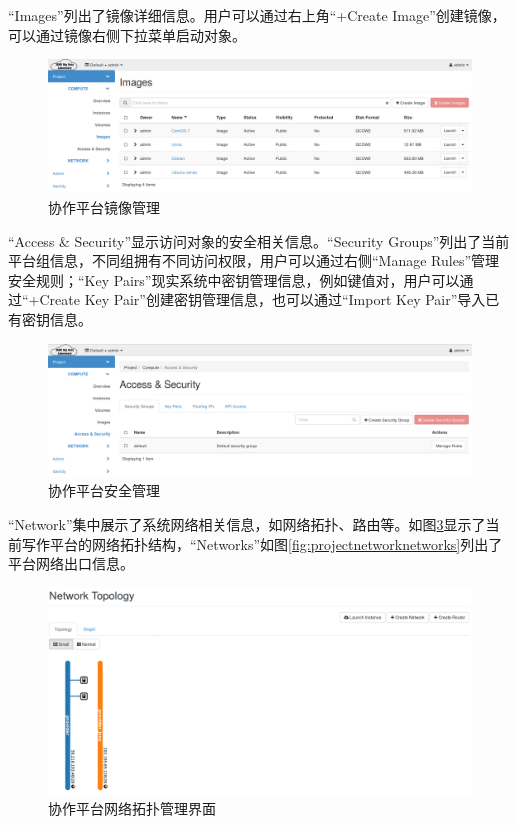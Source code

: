 \documentclass[12pt]{ctexart}%
\begin{document}
``Images''列出了镜像详细信息。用户可以通过右上角``+Create Image''创建镜像，可以通过镜像右侧下拉菜单启动对象。
\begin{figure}[!htb]
\centering
\includegraphics[width=6in]{./figures/Project_Compute_Images}
\caption{协作平台镜像管理}
\label{fig:projectcomputeimages}
\end{figure}
``Access \& Security''显示访问对象的安全相关信息。``Security Groups''列出了当前平台组信息，不同组拥有不同访问权限，用户可以通过右侧``Manage Rules''管理安全规则；``Key Pairs''现实系统中密钥管理信息，例如键值对，用户可以通过``+Create Key Pair''创建密钥管理信息，也可以通过``Import Key Pair''导入已有密钥信息。
\begin{figure}[!htb]
\centering
\includegraphics[width=6in]{./figures/Project_Compute_AccessSecurity}
\caption{协作平台安全管理}
\label{fig:projectcomputeAccessSecurity}
\end{figure}
``Network''集中展示了系统网络相关信息，如网络拓扑、路由等。如图\ref{fig:projectnetworktopology}显示了当前写作平台的网络拓扑结构，``Networks''如图\ref{fig:projectnetworknetworks}列出了平台网络出口信息。
\begin{figure}[!htb]
\centering
\includegraphics[width=6in]{./figures/Project_Network_Topology}
\caption{协作平台网络拓扑管理界面}
\label{fig:projectnetworktopology}
\end{figure}
\end{document}
